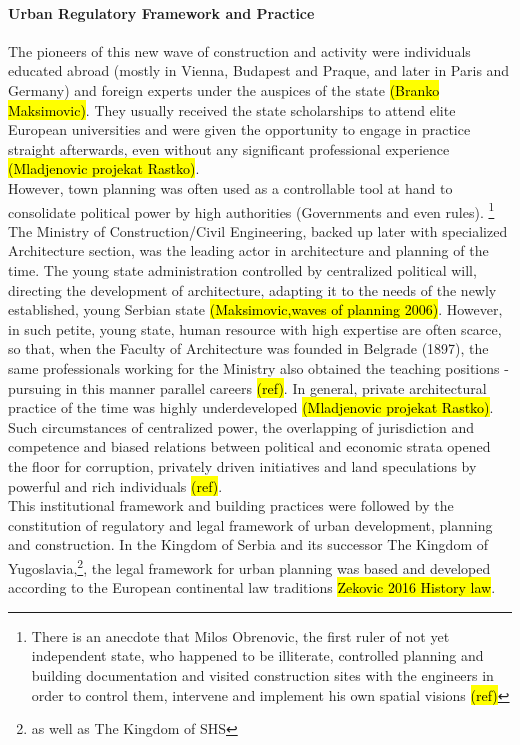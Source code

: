 \documentclass[11pt]{report}
\begin{document}
\paragraph{Urban Regulatory Framework and Practice}

The pioneers of this new wave of construction and activity were individuals educated abroad (mostly in Vienna, Budapest and Praque, and later in Paris and Germany) and foreign experts under the auspices of the state \hl{(Branko Maksimovic)}. They usually received the state scholarships to attend elite European universities and were given the opportunity to engage in practice straight afterwards, even without any significant professional experience \hl{(Mladjenovic projekat Rastko)}.
\\
However, town planning was often used as a controllable tool at hand to consolidate political power by high authorities (Governments and even rules). \footnote{There is an anecdote that Milos Obrenovic, the first ruler of not yet independent state, who happened to be illiterate, controlled planning and building documentation and visited construction sites with the engineers in order to control them, intervene and implement his own spatial visions \hl{(ref)}}
The Ministry of Construction/Civil Engineering, backed up later with specialized Architecture section, was the leading actor in architecture and planning of the time. The young state administration controlled by centralized political will, directing the development of architecture, adapting it to the needs of the newly established, young Serbian state \hl{(Maksimovic,waves of planning 2006)}. However, in such petite, young state, human resource with high expertise are often scarce, so that, when the Faculty of Architecture was founded in Belgrade (1897), the same professionals working for the Ministry also obtained the teaching positions - pursuing in this manner parallel careers \hl{(ref)}. In general, private architectural practice of the time was highly underdeveloped \hl{(Mladjenovic projekat Rastko)}. Such circumstances of centralized power, the overlapping of jurisdiction and competence and biased relations between political and economic strata opened the floor for corruption, privately driven initiatives and land speculations by powerful and rich individuals \hl{(ref)}.
\\
This institutional framework and building practices were followed by the constitution of regulatory and legal framework of urban development, planning and construction.
In the Kingdom of Serbia and its successor The Kingdom of Yugoslavia,\footnote{as well as The Kingdom of SHS}, the legal framework for urban planning was based and developed according to the European continental law traditions \hl{Zekovic 2016 History law}.
\end{document}
